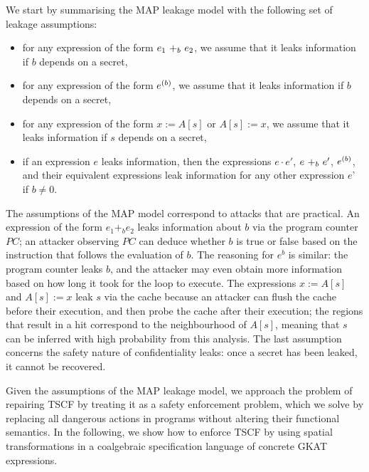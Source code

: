 We start by summarising the MAP leakage model with the following set of leakage assumptions:
\begin{itemize}
    \item for any expression of the form $\branch{b}{e_1}{e_2}$, we assume that it leaks information if $b$ depends on a secret,
    \item for any expression of the form $\iterate{b}{e}$, we assume that it leaks information if $b$ depends on a secret,
    \item for any expression of the form $x:=A[s]$ or $A[s]:=x$, we assume that it leaks information if $s$ depends on a secret,
    \item if an expression $e$ leaks information, then the expressions $e\cdot e'$, $\branch{b}{e}{e'}$, $\iterate{b}{e}$, and their equivalent expressions leak information for any other expression $e$' if $b\neq 0$.
\end{itemize}
The assumptions of the MAP model correspond to attacks that are practical. An expression of the form $e_1 +_b e_2$ leaks information about $b$ via the program counter $PC$; an attacker observing $PC$ can deduce whether $b$ is true or false based on the instruction that follows the evaluation of $b$. The reasoning for $e^b$ is similar: the program counter leaks $b$, and the attacker may even obtain more information based on how long it took for the loop to execute. The expressions $x:=A[s]$ and $A[s]:=x$ leak $s$ via the cache because an attacker can flush the cache before their execution, and then probe the cache after their execution; the regions that result in a hit correspond to the neighbourhood of $A[s]$, meaning that $s$ can be inferred with high probability from this analysis. The last assumption concerns the safety nature of confidentiality leaks: once a secret has been leaked, it cannot be recovered.

Given the assumptions of the MAP leakage model, we approach the problem of repairing TSCF by treating it as a safety enforcement problem, which we solve by replacing all dangerous actions in programs without altering their functional semantics. In the following, we show how to enforce TSCF by using spatial transformations in a coalgebraic specification language of concrete GKAT expressions. 



